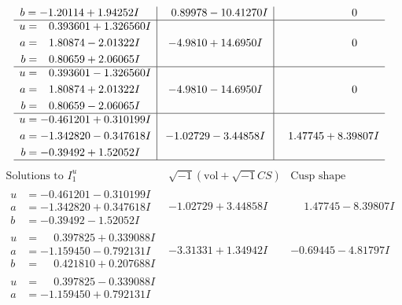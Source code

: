 \documentclass[1p]{elsarticle_modified}
\theoremstyle{definition}
\newcommand{\I}{\sqrt{-1}}
\begin{document}
$$\begin{array}{c|c|c}
\begin{aligned}
b &= -1.20114 + 1.94252 I\end{aligned}
 & \phantom{-}0.89978 - 10.41270 I & \phantom{-0.000000 } 0 \\ \hline\begin{aligned}
u &= \phantom{-}0.393601 + 1.326560 I \\
a &= \phantom{-}1.80874 - 2.01322 I \\
b &= \phantom{-}0.80659 + 2.06065 I\end{aligned}
 & -4.9810 + 14.6950 I & \phantom{-0.000000 } 0 \\ \hline\begin{aligned}
u &= \phantom{-}0.393601 - 1.326560 I \\
a &= \phantom{-}1.80874 + 2.01322 I \\
b &= \phantom{-}0.80659 - 2.06065 I\end{aligned}
 & -4.9810 - 14.6950 I & \phantom{-0.000000 } 0 \\ \hline\begin{aligned}
u &= -0.461201 + 0.310199 I \\
a &= -1.342820 - 0.347618 I \\
b &= -0.39492 + 1.52052 I\end{aligned}
 & -1.02729 - 3.44858 I & \phantom{-}1.47745 + 8.39807 I\\
 \hline 
 \end{array}$$\newpage$$\begin{array}{c|c|c}  
\text{Solutions to }I^u_{1}& \I (\text{vol} + \sqrt{-1}CS) & \text{Cusp shape}\\
 \hline 
\begin{aligned}
u &= -0.461201 - 0.310199 I \\
a &= -1.342820 + 0.347618 I \\
b &= -0.39492 - 1.52052 I\end{aligned}
 & -1.02729 + 3.44858 I & \phantom{-}1.47745 - 8.39807 I \\ \hline\begin{aligned}
u &= \phantom{-}0.397825 + 0.339088 I \\
a &= -1.159450 - 0.792131 I \\
b &= \phantom{-}0.421810 + 0.207688 I\end{aligned}
 & -3.31331 + 1.34942 I & -0.69445 - 4.81797 I \\ \hline\begin{aligned}
u &= \phantom{-}0.397825 - 0.339088 I \\
a &= -1.159450 + 0.792131 I \\

\end{aligned}
\end{array}$$
\end{document}
